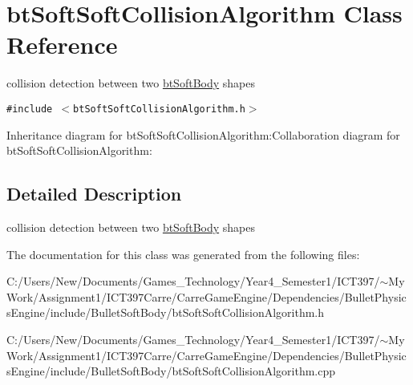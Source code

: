 \hypertarget{classbt_soft_soft_collision_algorithm}{
\section{btSoftSoftCollisionAlgorithm Class Reference}
\label{classbt_soft_soft_collision_algorithm}
}
collision detection between two \hyperlink{classbt_soft_body}{btSoftBody} shapes  


{\tt \#include $<$btSoftSoftCollisionAlgorithm.h$>$}

Inheritance diagram for btSoftSoftCollisionAlgorithm:Collaboration diagram for btSoftSoftCollisionAlgorithm:

\subsection{Detailed Description}
collision detection between two \hyperlink{classbt_soft_body}{btSoftBody} shapes 

The documentation for this class was generated from the following files:\begin{CompactItemize}
\item 
C:/Users/New/Documents/Games\_\-Technology/Year4\_\-Semester1/ICT397/$\sim$My Work/Assignment1/ICT397Carre/CarreGameEngine/Dependencies/BulletPhysicsEngine/include/BulletSoftBody/btSoftSoftCollisionAlgorithm.h\item 
C:/Users/New/Documents/Games\_\-Technology/Year4\_\-Semester1/ICT397/$\sim$My Work/Assignment1/ICT397Carre/CarreGameEngine/Dependencies/BulletPhysicsEngine/include/BulletSoftBody/btSoftSoftCollisionAlgorithm.cpp\end{CompactItemize}
